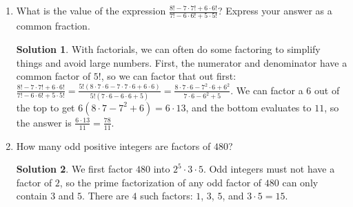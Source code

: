 \documentclass{article}
\theoremstyle{definition}
\newtheorem*{solution}{Solution}
\begin{document}
\begin{enumerate}
    \item What is the value of the expression $\frac{8! - 7 \cdot 7! + 6 \cdot 
        6!} {7! - 6 \cdot 6! + 5 \cdot 5!}$? Express your answer as a common 
        fraction.
        \begin{solution}
            With factorials, we can often do some factoring to simplify things 
            and avoid large numbers. First, the numerator and denominator have a 
            common factor of $5!$, so we can factor that out first: $\frac{8! - 
            7 \cdot 7! + 6 \cdot 6!}{7! - 6 \cdot 6! + 5 \cdot 5!} = \frac{5!(8 
            \cdot 7 \cdot 6 - 7 \cdot 7 \cdot 6 + 6 \cdot 6)}{5!(7 \cdot 6 - 6 
            \cdot 6 + 5)} = \frac{8 \cdot 7 \cdot 6 - 7^2 \cdot 6 + 6^2}{7 \cdot 
            6 - 6^2 + 5}$. We can factor a $6$ out of the top to get $6(8 \cdot 
            7 - 7^2 + 6) = 6 \cdot 13$, and the bottom evaluates to $11$, so the 
            answer is $\frac{6 \cdot 13}{11} = \frac{78}{11}$.
        \end{solution}
    \item How many odd positive integers are factors of $480$?
        \begin{solution}
            We first factor $480$ into $2^5 \cdot 3 \cdot 5$. Odd integers must 
            not have a factor of $2$, so the prime factorization of any odd 
            factor of $480$ can only contain $3$ and $5$. There are $4$ such 
            factors: $1$, $3$, $5$, and $3 \cdot 5 = 15$.
        \end{solution}
\end{enumerate}
\end{document}
